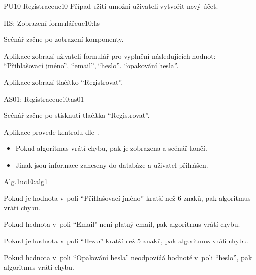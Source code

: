 \begin{usecase}{PU10 Registrace}{uc10}
    Případ užití umožní uživateli vytvořit nový účet.

    \begin{scenario}{HS: Zobrazení formuláře}{uc10:hs}
        \item Scénář začne po zobrazení komponenty.
        \item Aplikace zobrazí uživateli formulář pro vyplnění následujících hodnot: \enquote{Přihlašovací jméno}, \enquote{email}, \enquote{heslo}, \enquote{opakování hesla}.
        \item Aplikace zobrazí tlačítko \enquote{Registrovat}.
    \end{scenario}

    \begin{scenario}{AS01: Registrace}{uc10:as01}
        \item Scénář začne po stisknutí tlačítka \enquote{Registrovat}.
        \item Aplikace provede kontrolu dle~.
        \begin{itemize}
            \item Pokud algoritmus vrátí chybu, pak je zobrazena a scénář končí.
            \item Jinak jsou informace zaneseny do databáze a uživatel přihlášen.
        \end{itemize}
    \end{scenario}

    \begin{scenario}{Alg.1}{uc10:alg1}
        \item Pokud je hodnota v~poli \enquote{Přihlašovací jméno} kratší než 6 znaků, pak algoritmus vrátí chybu.
        \item Pokud hodnota v~poli \enquote{Email} není platný email, pak algoritmus vrátí chybu.
        \item Pokud je hodnota v~poli \enquote{Heslo} kratší než 5 znaků, pak algoritmus vrátí chybu.
        \item Pokud hodnota v~poli \enquote{Opakování hesla} neodpovídá hodnotě v~poli \enquote{heslo}, pak algoritmus vrátí chybu.
    \end{scenario}
\end{usecase}